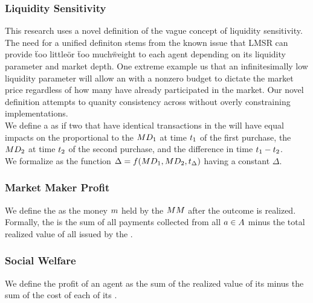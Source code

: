 \subsubsection{Liquidity Sensitivity}
This research uses a novel definition of the vague concept of liquidity sensitivity. The need
for a unified definiton stems from the known issue that LMSR can provide \"too little\" or 
\"too much\" weight to each agent depending on its liquidity parameter and market depth. One extreme
example us that an infinitesimally low liquidity parameter will allow an  with a nonzero
budget to dictate the market price regardless of how many  have already participated in
the market. Our novel definition attempts to quanity consistency across  without
overly constraining implementations. \\

We define a  as  if two  that have identical
transactions in the  will have equal impacts on the  proportional to 
the  $MD_{1}$ at time $t_{1}$ of the first purchase, the  
$MD_{2}$ at time $t_{2}$ of the second purchase, and the difference in time $t_{1} - t_{2}$.\\

We formalize  as the function $\Delta = f(MD_{1},MD_{2},t_{\Delta})$
having a constant $\Delta$.\\

\subsubsection{Market Maker Profit}
We define the  as the money $m$ held by the  $MM$
after the outcome is realized. Formally, the  is the sum of all payments collected from
all  $a\in A$ minus the total realized value of all  issued by the
.

\subsubsection{Social Welfare}
We define the profit of an agent as the sum of the realized value of its  minus the
sum of the cost of each of its .


